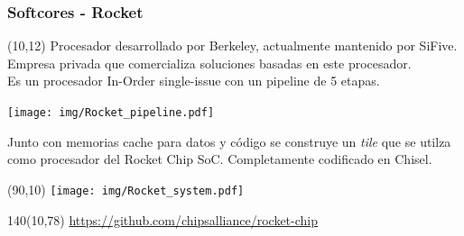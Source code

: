\documentclass[aspectratio=169]{beamer}
\begin{document}
\begin{frame}[t,fragile]
    \frametitle{Softcores - Rocket}
    \begin{textblock}{68}(10,12) \footnotesize
    Procesador desarrollado por Berkeley, actualmente mantenido por SiFive. \textcolor{verdeuca}{Empresa privada que comercializa soluciones basadas en este procesador.}\\
    \bigskip
    Es un procesador In-Order single-issue con un pipeline de 5 etapas.\\
    \begin{center}
     \texttt{[image: img/Rocket\_pipeline.pdf]}
    \end{center}
    Junto con memorias cache para datos y código se construye un \emph{tile} que se utilza como procesador del Rocket Chip SoC.
    \textcolor{verdeuca}{Completamente codificado en Chisel.}
    \end{textblock}
    \begin{textblock}{55}(90,10) \texttt{[image: img/Rocket\_system.pdf]} \end{textblock}
    \begin{textblock}{140}(10,78) \footnotesize
    \url{https://github.com/chipsalliance/rocket-chip}
    \end{textblock}
\end{frame}
\end{document}
